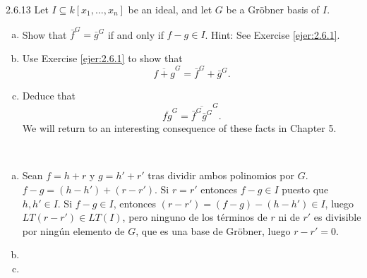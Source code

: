 \documentclass[twoside]{article}
\begin{document}
\newpage

\begin{ejercicio}{2.6.13}
Let $I ⊆ k[x_1,\dots , x_n]$ be an ideal, and let $G$ be a Gröbner basis of $I$.
\begin{enumerate}[a.]
\item Show that $\bar{f}^G = \bar{g}^G$ if and only if $f − g ∈ I$. Hint: See Exercise \ref{ejer:2.6.1}.
\item Use Exercise \ref{ejer:2.6.1} to show that
$$\overline{f + g}^G = \bar{f}^G + \bar{g}^G.$$
\item Deduce that
$$\overline{fg}^G = \overline{\bar{f}^G  \bar{g}^G}^G
.$$
We will return to an interesting consequence of these facts in Chapter 5.
\end{enumerate}
\end{ejercicio}
\begin{solucion}\
\begin{enumerate}[a.]
\item Sean $f=h+r$ y $g=h'+r'$ tras dividir ambos polinomios por $G$. $f-g=(h-h')+(r-r')$. Si $r=r'$ entonces $f-g\in I$ puesto que $h,h'\in I$. Si $f-g\in I$, entonces $(r-r')=(f-g)-(h-h')\in I$, luego $LT(r-r')\in LT(I)$, pero ninguno de los términos de $r$ ni de $r'$ es divisible por ningún elemento de $G$, que es una base de Gröbner, luego $r-r'=0$. 
\item
\item
\end{enumerate}
\end{solucion}
\end{document}
